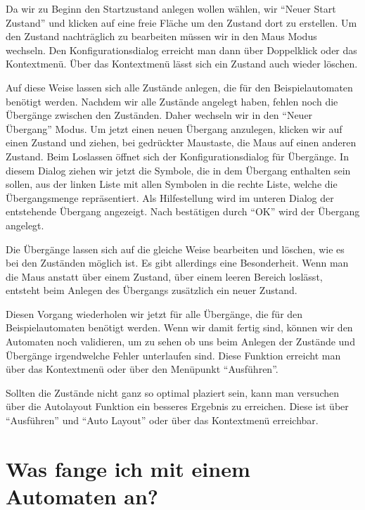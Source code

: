 Da wir zu Beginn den Startzustand anlegen wollen wählen, wir "`Neuer
Start Zustand"' und klicken auf eine freie Fläche um den Zustand dort zu
erstellen. Um den Zustand nachträglich zu bearbeiten müssen wir in den Maus
Modus wechseln. Den Konfigurationsdialog erreicht man dann über Doppelklick oder das
Kontextmenü. Über das Kontextmenü lässt sich ein Zustand
auch wieder löschen.\vspace{10pt}

Auf diese Weise lassen sich alle Zustände anlegen, die für den Beispielautomaten
benötigt werden. Nachdem wir alle Zustände angelegt haben, fehlen noch die
Übergänge zwischen den Zuständen. Daher wechseln wir in den "`Neuer Übergang"'
Modus. Um jetzt einen neuen Übergang anzulegen, klicken wir auf einen Zustand 
und ziehen, bei gedrückter Maustaste, die Maus auf einen anderen Zustand. Beim
Loslassen öffnet sich der Konfigurationsdialog für Übergänge. In diesem Dialog 
ziehen wir jetzt die Symbole, die in dem Übergang enthalten sein sollen, aus
der linken Liste mit allen Symbolen in die rechte Liste, welche die
Übergangsmenge repräsentiert. Als Hilfestellung wird im unteren Dia\-log der entstehende
Übergang angezeigt. Nach bestätigen durch "`OK"' wird der Übergang
angelegt.\vspace{10pt}

Die Übergänge lassen sich auf die gleiche Weise bearbeiten und löschen, wie
es bei den Zuständen möglich ist. Es gibt allerdings eine Besonderheit. Wenn
man die Maus anstatt über einem Zustand, über einem leeren Bereich
loslässt, entsteht beim Anlegen des Übergangs zusätzlich ein neuer Zustand.\vspace{10pt}

Diesen Vorgang wiederholen wir jetzt für alle Übergänge, die
für den Beispielautomaten benötigt werden. Wenn wir damit fertig sind, können
wir den Automaten noch validieren, um zu sehen ob uns beim Anlegen der Zustände
und Übergänge irgendwelche Fehler unterlaufen sind. Diese Funktion erreicht man
über das Kontextmenü oder über den Menüpunkt "`Ausführen"'.\vspace{10pt}


Sollten die Zustände nicht ganz so optimal plaziert sein, kann man
versuchen über die Autolayout Funktion ein besseres Ergebnis zu
erreichen. Diese ist über "`Ausführen"' und "`Auto Layout"' oder über
das Kontextmenü erreichbar.

\section{Was fange ich mit einem Automaten an?}

